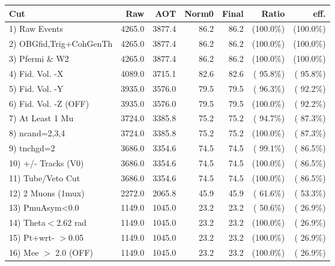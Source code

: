  \begin{table}[h!]\centering
 \begin{tabular}{||l||r|r|r|r|r|r||}
 \hline
 \hline
 Cut & Raw & AOT & Norm0 & Final & Ratio & eff.       \\
 \hline
  1) Raw Events           &       4265.0 &       3877.4 &         86.2 &         86.2 & (100.0\%) & (100.0\%) \\
  2) OBGfid,Trig+CohGenTh &       4265.0 &       3877.4 &         86.2 &         86.2 & (100.0\%) & (100.0\%) \\
  3) Pfermi \& W2         &       4265.0 &       3877.4 &         86.2 &         86.2 & (100.0\%) & (100.0\%) \\
  4) Fid. Vol. -X         &       4089.0 &       3715.1 &         82.6 &         82.6 & ( 95.8\%) & ( 95.8\%) \\
  5) Fid. Vol. -Y         &       3935.0 &       3576.0 &         79.5 &         79.5 & ( 96.3\%) & ( 92.2\%) \\
  6) Fid. Vol. -Z (OFF)   &       3935.0 &       3576.0 &         79.5 &         79.5 & (100.0\%) & ( 92.2\%) \\
  7) At Least 1 Mu        &       3724.0 &       3385.8 &         75.2 &         75.2 & ( 94.7\%) & ( 87.3\%) \\
  8) ncand=2,3,4          &       3724.0 &       3385.8 &         75.2 &         75.2 & (100.0\%) & ( 87.3\%) \\
  9) tnchgd=2             &       3686.0 &       3354.6 &         74.5 &         74.5 & ( 99.1\%) & ( 86.5\%) \\
 10) +/- Tracks (V0)      &       3686.0 &       3354.6 &         74.5 &         74.5 & (100.0\%) & ( 86.5\%) \\
 11) Tube/Veto Cut        &       3686.0 &       3354.6 &         74.5 &         74.5 & (100.0\%) & ( 86.5\%) \\
 12) 2 Muons (1mux)       &       2272.0 &       2065.8 &         45.9 &         45.9 & ( 61.6\%) & ( 53.3\%) \\
 13) PmuAsym<0.0          &       1149.0 &       1045.0 &         23.2 &         23.2 & ( 50.6\%) & ( 26.9\%) \\
 14) Theta$<$2.62 rad     &       1149.0 &       1045.0 &         23.2 &         23.2 & (100.0\%) & ( 26.9\%) \\
 15) Pt+wrt- $>$0.05      &       1149.0 &       1045.0 &         23.2 &         23.2 & (100.0\%) & ( 26.9\%) \\
 16) Mee $>$ 2.0  (OFF)   &       1149.0 &       1045.0 &         23.2 &         23.2 & (100.0\%) & ( 26.9\%) \\

\end{tabular}
\end{table}
